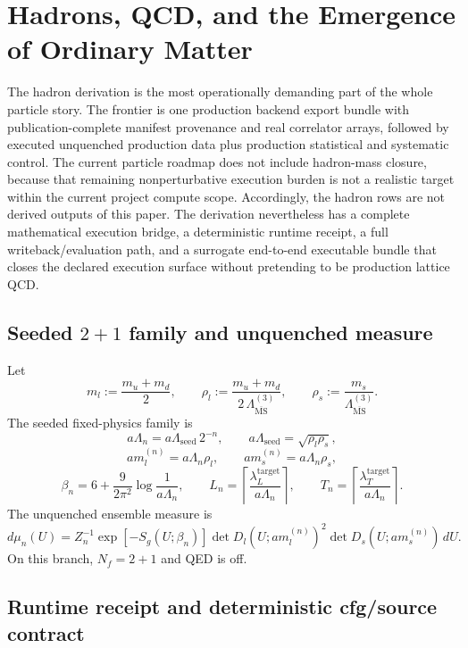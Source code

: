 \documentclass[11pt]{article}
\begin{document}
\section{Hadrons, QCD, and the Emergence of Ordinary Matter}

The hadron derivation is the most operationally demanding part of the whole particle story. The
frontier is one production backend export bundle with publication-complete manifest provenance and real correlator arrays, followed by executed unquenched production data plus
production statistical and systematic control. The current particle roadmap does not include hadron-mass closure, because that remaining nonperturbative execution burden is not a realistic target within the current project compute scope. Accordingly, the hadron rows are not
derived outputs of this paper. The derivation nevertheless has a complete
mathematical execution bridge, a deterministic runtime receipt, a full writeback/evaluation path,
and a surrogate end-to-end executable bundle that closes the declared execution surface without
pretending to be production lattice QCD.

\subsection{Seeded \(2+1\) family and unquenched measure}

Let
\[
m_l := \frac{m_u+m_d}{2},
\qquad
\rho_l := \frac{m_u+m_d}{2\,\Lambda_{\overline{\mathrm{MS}}}^{(3)}},
\qquad
\rho_s := \frac{m_s}{\Lambda_{\overline{\mathrm{MS}}}^{(3)}}.
\]
The seeded fixed-physics family is
\[
a\Lambda_n = a\Lambda_{\mathrm{seed}}\,2^{-n},
\qquad
a\Lambda_{\mathrm{seed}} = \sqrt{\rho_l \rho_s},
\]
\[
a m_l^{(n)} = a\Lambda_n \rho_l,
\qquad
a m_s^{(n)} = a\Lambda_n \rho_s,
\]
\[
\beta_n = 6 + \frac{9}{2\pi^2}\log\!\frac{1}{a\Lambda_n},
\qquad
L_n = \left\lceil \frac{\lambda_L^{\mathrm{target}}}{a\Lambda_n}\right\rceil,
\qquad
T_n = \left\lceil \frac{\lambda_T^{\mathrm{target}}}{a\Lambda_n}\right\rceil.
\]
The unquenched ensemble measure is
\[
d\mu_n(U)
=
Z_n^{-1}
\exp[-S_g(U;\beta_n)]
\det D_l(U; a m_l^{(n)})^2
\det D_s(U; a m_s^{(n)})
\,dU.
\]
On this branch, \(N_f=2+1\) and QED is off.

\subsection{Runtime receipt and deterministic cfg/source contract}
\end{document}
